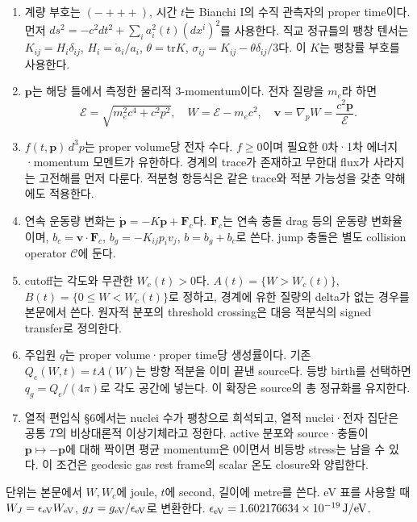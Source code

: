 \documentclass[11pt,a4paper]{article}
\providecommand{\tightlist}{\setlength{\itemsep}{2pt}\setlength{\parskip}{0pt}}
\begin{document}
\begin{enumerate}
\def\labelenumi{\arabic{enumi}.}
\tightlist
\item
  계량 부호는 \((-+++ )\), 시간 \(t\)는 Bianchi I의 수직 관측자의 proper time이다. 먼저 \(ds^2=-c^2dt^2+\sum_i a_i^2(t)(dx^i)^2\)를 사용한다. 직교 정규틀의 팽창 텐서는 \(K_{ij}=H_i\delta_{ij}\), \(H_i=\dot a_i/a_i\), \(\theta=\mathrm{tr}K\), \(\sigma_{ij}=K_{ij}-\theta\delta_{ij}/3\)다. 이 \(K\)는 팽창률 부호를 사용한다.
\item
  \(\boldsymbol p\)는 해당 틀에서 측정한 물리적 3-momentum이다. 전자 질량을 \(m_e\)라 하면 \[
  \mathcal E=\sqrt{m_e^2c^4+c^2p^2},\quad W=\mathcal E-m_ec^2,\quad
  \boldsymbol v=\nabla_pW=\frac{c^2\boldsymbol p}{\mathcal E}.
  \tag{MC3}
  \]
\item
  \(f(t,\boldsymbol p)\,d^3p\)는 proper volume당 전자 수다. \(f\ge0\)이며 필요한 0차·1차 에너지·momentum 모멘트가 유한하다. 경계의 trace가 존재하고 무한대 flux가 사라지는 고전해를 먼저 다룬다. 적분형 항등식은 같은 trace와 적분 가능성을 갖춘 약해에도 적용한다.
\item
  연속 운동량 변화는 \(\dot{\boldsymbol p}=-K\boldsymbol p+\boldsymbol F_c\)다. \(\boldsymbol F_c\)는 연속 충돌 drag 등의 운동량 변화율이며, \(b_c=\boldsymbol v\cdot\boldsymbol F_c\), \(b_g=-K_{ij}p_i v_j\), \(b=b_g+b_c\)로 쓴다. jump 충돌은 별도 collision operator \(\mathcal C\)에 둔다.
\item
  cutoff는 각도와 무관한 \(W_c(t)>0\)다. \(A(t)=\{W>W_c(t)\}\), \(B(t)=\{0\le W<W_c(t)\}\)로 정하고, 경계에 유한 질량의 delta가 없는 경우를 본문에서 쓴다. 원자적 분포의 threshold crossing은 대응 적분식의 signed transfer로 정의한다.
\item
  주입원 \(q\)는 proper volume·proper time당 생성률이다. 기존 \(Q_e(W,t)=tA(W)\)는 방향 적분을 이미 끝낸 source다. 등방 birth를 선택하면 \(q_g=Q_e/(4\pi)\)로 각도 공간에 넣는다. 이 확장은 source의 총 정규화를 유지한다.
\item
  열적 편입식 §6에서는 nuclei 수가 팽창으로 희석되고, 열적 nuclei·전자 집단은 공통 \(T\)의 비상대론적 이상기체라고 정한다. active 분포와 source·충돌이 \(\boldsymbol p\mapsto-\boldsymbol p\)에 대해 짝이면 평균 momentum은 0이면서 비등방 stress는 남을 수 있다. 이 조건은 geodesic gas rest frame의 scalar 온도 closure와 양립한다.
\end{enumerate}

단위는 본문에서 \(W,W_c\)에 joule, \(t\)에 second, 길이에 metre를 쓴다. eV 표를 사용할 때 \(W_J=\epsilon_{\rm eV}W_{\rm eV}\), \(g_J=g_{\rm eV}/\epsilon_{\rm eV}\)로 변환한다. \(\epsilon_{\rm eV}=1.602176634\times10^{-19}\,\mathrm{J/eV}\).
\end{document}
